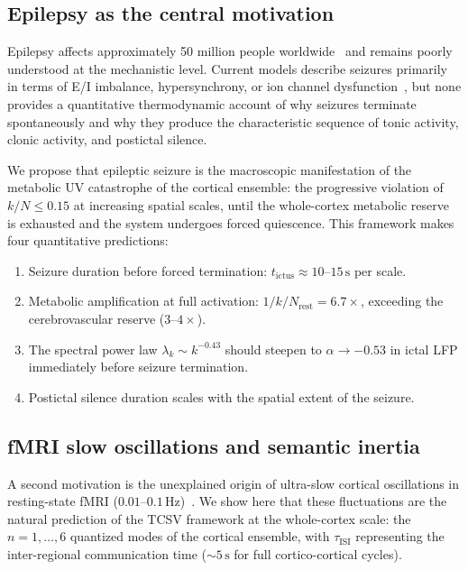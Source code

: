 \documentclass[aps,pre,twocolumn,showpacs,superscriptaddress,longbibliography]{revtex4-2}
\newcommand{\kN}{k/N}
\newcommand{\tauISI}{\tau_{\mathrm{ISI}}}
\begin{document}
\subsection{Epilepsy as the central motivation}

Epilepsy affects approximately 50 million people
worldwide~\cite{WHO2023} and remains poorly understood at the
mechanistic level. Current models describe seizures primarily
in terms of E/I imbalance, hypersynchrony, or ion channel
dysfunction~\cite{Stafstrom2010}, but none provides a
quantitative thermodynamic account of why seizures terminate
spontaneously and why they produce the characteristic sequence
of tonic activity, clonic activity, and postictal silence.

We propose that epileptic seizure is the macroscopic
manifestation of the metabolic UV catastrophe of the cortical
ensemble: the progressive violation of $\kN \leq 0.15$ at
increasing spatial scales, until the whole-cortex metabolic
reserve is exhausted and the system undergoes forced quiescence.
This framework makes four quantitative predictions:
\begin{enumerate}
\item Seizure duration before forced termination:
  $t_{\mathrm{ictus}} \approx 10$--$15\,\mathrm{s}$ per scale.
\item Metabolic amplification at full activation:
  $1/\kN_{\mathrm{rest}} = 6.7\times$, exceeding the
  cerebrovascular reserve ($3$--$4\times$).
\item The spectral power law $\lambda_k \sim k^{-0.43}$
  should steepen to $\alpha \to -0.53$ in ictal LFP
  immediately before seizure termination.
\item Postictal silence duration scales with the spatial
  extent of the seizure.
\end{enumerate}

\subsection{fMRI slow oscillations and semantic inertia}

A second motivation is the unexplained origin of ultra-slow
cortical oscillations in resting-state fMRI
($0.01$--$0.1\,\mathrm{Hz}$)~\cite{Biswal1995,Fox2007}.
We show here that these fluctuations are the natural prediction
of the TCSV framework at the whole-cortex scale: the
$n = 1,\ldots,6$ quantized modes of the cortical ensemble,
with $\tauISI$ representing the inter-regional communication
time ($\sim 5\,\mathrm{s}$ for full cortico-cortical cycles).
\end{document}
